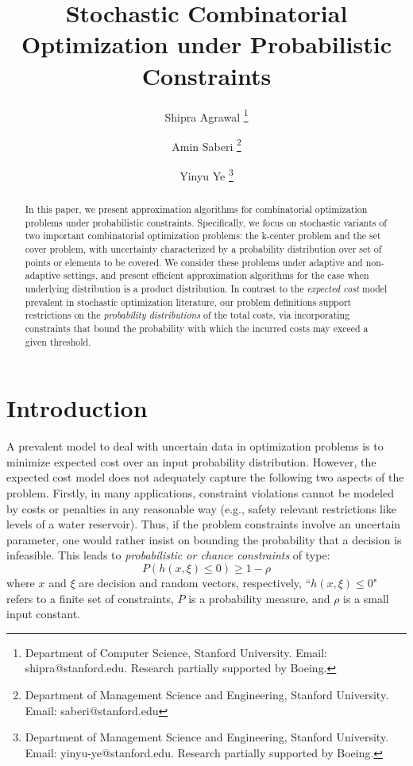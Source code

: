 \documentclass[11pt,onecolumn]{article}
\newcommand{\newtext}[1]{{#1}}
\begin{document}
\title{Stochastic Combinatorial Optimization under Probabilistic Constraints}
\author{
Shipra Agrawal \thanks{Department of Computer Science, Stanford University. 
Email: shipra@stanford.edu. Research partially supported by Boeing.}
    \and 
Amin Saberi \thanks{Department of Management Science and Engineering, Stanford University. Email: saberi@stanford.edu}
\and
Yinyu Ye \thanks{Department of Management Science and Engineering,
Stanford University. 
Email: yinyu-ye@stanford.edu. Research partially supported by Boeing.}
} 
\maketitle
\date{ }
\begin{abstract}
{\small
In this paper, we present approximation algorithms for combinatorial optimization problems under probabilistic constraints. Specifically, we focus on stochastic variants of two important combinatorial optimization problems: the k-center problem and the set cover problem, with uncertainty characterized by a probability distribution over set of points or elements to be covered. 
We consider these problems under adaptive and non-adaptive settings, and present efficient approximation algorithms for the case when underlying distribution is a product distribution. 
\newtext{In contrast to the {\it expected cost} model prevalent in stochastic optimization literature, our problem definitions support restrictions on the {\it probability distributions} of the total costs, via incorporating constraints that bound the probability with which the incurred costs may exceed a given threshold}. 
}
\end{abstract}
\section{Introduction}
\label{Intro}
\newtext{A prevalent model to deal with uncertain data in optimization problems is to minimize expected cost over an input probability distribution. However, the expected cost model does not adequately capture the following two aspects of the problem. Firstly, in many applications, constraint violations cannot be modeled by costs or penalties in any reasonable way (e.g., safety relevant restrictions like levels of a water reservoir). Thus, if the problem constraints involve an uncertain parameter, one would rather insist on bounding the probability that a decision is infeasible.}
This leads to {\it probabilistic or chance constraints} of type:
$$P(h(x,\xi) \le 0) \ge 1-\rho$$  
	where $x$ and $\xi$ are decision and random vectors, respectively, ``$h(x,\xi) \le 0$" refers to a finite set of constraints, $P$ is a probability measure, and $\rho$ is a small input constant.
\end{document}
